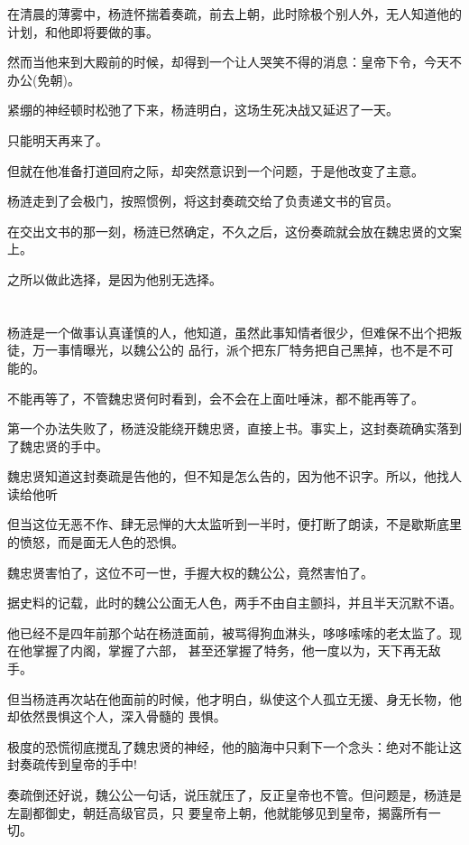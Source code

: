 \documentclass[11pt,a4paper,onecolumn]{article}
\begin{document}
在清晨的薄雾中，杨涟怀揣着奏疏，前去上朝，此时除极个别人外，无人知道他的计划，和他即将要做的事。

然而当他来到大殿前的时候，却得到一个让人哭笑不得的消息：皇帝下令，今天不办公(免朝)。

紧绷的神经顿时松弛了下来，杨涟明白，这场生死决战又延迟了一天。

只能明天再来了。

但就在他准备打道回府之际，却突然意识到一个问题，于是他改变了主意。

杨涟走到了会极门，按照惯例，将这封奏疏交给了负责递文书的官员。

在交出文书的那一刻，杨涟已然确定，不久之后，这份奏疏就会放在魏忠贤的文案上。

之所以做此选择，是因为他别无选择。

\section[\thesection]{}

杨涟是一个做事认真谨慎的人，他知道，虽然此事知情者很少，但难保不出个把叛徒，万一事情曝光，以魏公公的
品行，派个把东厂特务把自己黑掉，也不是不可能的。

不能再等了，不管魏忠贤何时看到，会不会在上面吐唾沫，都不能再等了。

第一个办法失败了，杨涟没能绕开魏忠贤，直接上书。事实上，这封奏疏确实落到了魏忠贤的手中。

魏忠贤知道这封奏疏是告他的，但不知是怎么告的，因为他不识字。所以，他找人读给他听

但当这位无恶不作、肆无忌惮的大太监听到一半时，便打断了朗读，不是歇斯底里的愤怒，而是面无人色的恐惧。

魏忠贤害怕了，这位不可一世，手握大权的魏公公，竟然害怕了。

据史料的记载，此时的魏公公面无人色，两手不由自主颤抖，并且半天沉默不语。

他已经不是四年前那个站在杨涟面前，被骂得狗血淋头，哆哆嗦嗦的老太监了。现在他掌握了内阁，掌握了六部，
甚至还掌握了特务，他一度以为，天下再无敌手。

但当杨涟再次站在他面前的时候，他才明白，纵使这个人孤立无援、身无长物，他却依然畏惧这个人，深入骨髓的
畏惧。

极度的恐慌彻底搅乱了魏忠贤的神经，他的脑海中只剩下一个念头：绝对不能让这封奏疏传到皇帝的手中!

奏疏倒还好说，魏公公一句话，说压就压了，反正皇帝也不管。但问题是，杨涟是左副都御史，朝廷高级官员，只
要皇帝上朝，他就能够见到皇帝，揭露所有一切。
\end{document}
